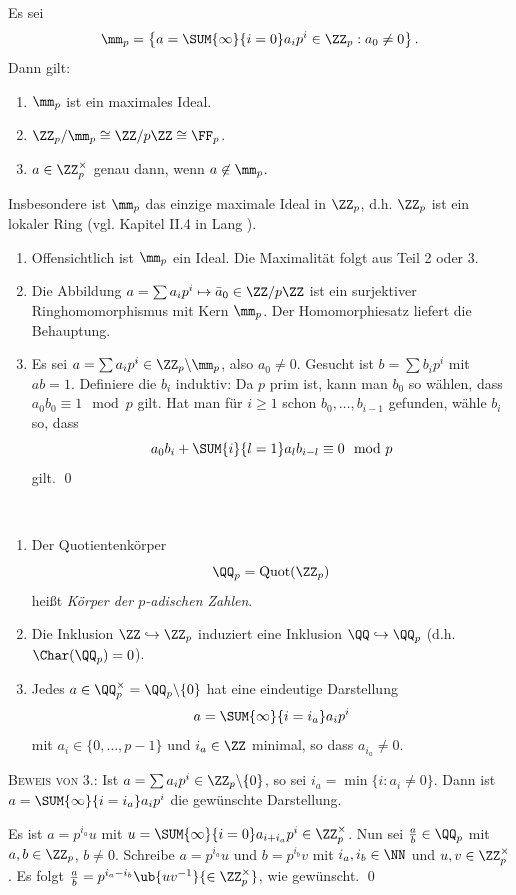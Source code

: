 \BEM Es sei
\[
\mm_p = \left\{
a=\SUM{\infty}{i=0} a_i p^i \in \ZZ_p : a_0\neq 0
\right\}.
\]
Dann gilt:
\begin{enumerate}
\item $\mm_p$ ist ein maximales Ideal.
\item $\ZZ_p/\mm_p \cong \ZZ/p\ZZ \cong \FF_p$.
\item $a\in \ZZ_p^\times$ genau dann, wenn $a\not\in\mm_p$.
\end{enumerate}
Insbesondere ist $\mm_p$ das einzige maximale Ideal in $\ZZ_p$,
d.h. $\ZZ_p$ ist ein lokaler Ring (vgl. Kapitel II.4 in 
Lang \cite{lang}).

\bew \begin{enumerate}
\item Offensichtlich ist $\mm_p$ ein Ideal. Die Maximalität
folgt aus Teil 2 oder 3.
\item Die Abbildung $a=\sum a_i p^i \mapsto \bar{a}_0\in \ZZ/p\ZZ$
ist ein surjektiver Ringhomomorphismus mit Kern $\mm_p$.
Der Homomorphiesatz liefert die Behauptung.
\item Es sei $a=\sum a_i p^i \in \ZZ_p\backslash \mm_p$, also
$a_0\neq 0$. Gesucht ist $b=\sum b_i p^i$ mit $ab=1$.
Definiere die $b_i$ induktiv: Da $p$ prim ist, kann man $b_0$ so 
wählen, dass $a_0 b_0 \equiv 1 \mod p$ gilt.
Hat man für $i\geq 1$ schon $b_0,\ldots,b_{i-1}$ gefunden, wähle
$b_i$ so, dass
\[
a_0 b_i + \SUM{i}{l=1} a_l b_{i-l} \equiv 0 \mod p
\]
gilt.
\qed
\end{enumerate}

\DB\
\begin{enumerate}
\item Der Quotientenkörper
\[
\QQ_p = \mathrm{Quot}(\ZZ_p)
\]
heißt \emph{Körper der $p$-adischen Zahlen}.
\item Die Inklusion $\ZZ\hookrightarrow \ZZ_p$ induziert eine
Inklusion $\QQ\hookrightarrow \QQ_p$ (d.h. $\Char(\QQ_p)=0$).
\item Jedes $a\in \QQ_p^\times=\QQ_p\backslash\{0\}$ hat eine
eindeutige Darstellung
\[
a=\SUM{\infty}{i=i_a} a_i p^i
\]
mit $a_i\in\{0,\ldots,p-1\}$ und $i_a\in\ZZ$ minimal, so dass
$a_{i_a}\neq 0$.
\end{enumerate}
\textsc{Beweis von 3.:} Ist $a=\sum a_i p^i\in\ZZ_p\backslash\{0\}$,
so sei $i_a=\min\{i:a_i\neq 0\}$.
Dann ist $a=\SUM{\infty}{i=i_a} a_i p^i$ die gewünschte Darstellung.

Es ist $a=p^{i_a} u$ mit $u=\SUM{\infty}{i=0}a_{i+i_a} p^i\in\ZZ_p^\times$.
Nun sei $\frac{a}{b}\in\QQ_p$ mit $a,b\in\ZZ_p$, $b\neq 0$.
Schreibe $a=p^{i_a} u$ und $b=p^{i_b}v$ mit $i_a,i_b\in\NN$ und
$u,v\in\ZZ_p^\times$.
Es folgt
$\frac{a}{b}=p^{i_a-i_b} \ub{uv^{-1}}{\in\ZZ_p^\times}$,
wie gewünscht.
\qed

